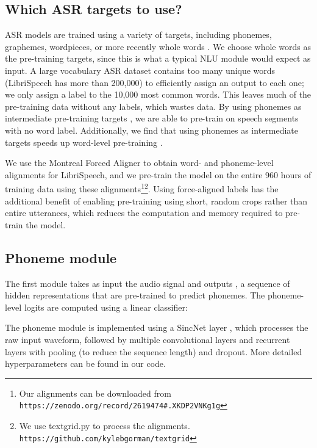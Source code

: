 \documentclass[a4paper]{article}
\begin{document}
\subsection{Which ASR targets to use?}
ASR models are trained using a variety of targets, including phonemes, graphemes, wordpieces, or more recently whole words \cite{45675, Audhkhasi2017, Kartik2018}. We choose whole words as the pre-training targets, since this is what a typical NLU module would expect as input. A large vocabulary ASR dataset contains too many unique words (LibriSpeech \cite{LibriSpeech} has more than 200,000) to efficiently assign an output to each one; we only assign a label to the 10,000 most common words. This leaves much of the pre-training data without any labels, which wastes data. By using phonemes as intermediate pre-training targets \cite{Fernandez2007, sanh2018hmtl, caruana1997multitask}, we are able to pre-train on speech segments with no word label. Additionally, we find that using phonemes as intermediate targets speeds up word-level pre-training \cite{nguyen2019, hierarchical_CTC, krishna2018hierarchical}.

We use the Montreal Forced Aligner \cite{McAuliffe2017} to obtain word- and phoneme-level alignments for LibriSpeech, and we pre-train the model on the entire 960 hours of training data using these alignments\footnote{Our alignments can be downloaded from\\ \texttt{https://zenodo.org/record/2619474\#.XKDP2VNKg1g}}\footnote{We use textgrid.py to process the alignments.\\ \texttt{https://github.com/kylebgorman/textgrid}}. Using force-aligned labels has the additional benefit of enabling pre-training using short, random crops rather than entire utterances, which reduces the computation and memory required to pre-train the model.

\subsection{Phoneme module}
The first module takes as input the audio signal and outputs , a sequence of hidden representations that are pre-trained to predict phonemes. The phoneme-level logits are computed using a linear classifier:


The phoneme module is implemented using a SincNet layer \cite{Ravanelli2018,sincnet_irasl}, which processes the raw input waveform, followed by multiple convolutional layers and recurrent layers with pooling (to reduce the sequence length) and dropout. More detailed hyperparameters can be found in our code.
\end{document}
